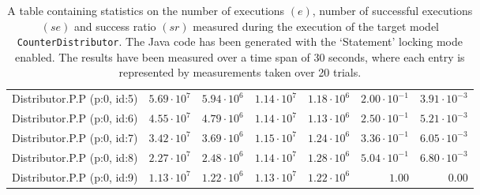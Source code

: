 \begin{table}[htbp]
{\begin{tabular}{lrrrrrr}
\hspace{3mm}Distributor.P.P (p:0, id:5) & $5.69 \cdot 10^{7}$ & $5.94 \cdot 10^{6}$ & $1.14 \cdot 10^{7}$ & $1.18 \cdot 10^{6}$ & $2.00 \cdot 10^{-1}$ & $3.91 \cdot 10^{-3}$ \\
\hspace{3mm}Distributor.P.P (p:0, id:6) & $4.55 \cdot 10^{7}$ & $4.79 \cdot 10^{6}$ & $1.14 \cdot 10^{7}$ & $1.13 \cdot 10^{6}$ & $2.50 \cdot 10^{-1}$ & $5.21 \cdot 10^{-3}$ \\
\hspace{3mm}Distributor.P.P (p:0, id:7) & $3.42 \cdot 10^{7}$ & $3.69 \cdot 10^{6}$ & $1.15 \cdot 10^{7}$ & $1.24 \cdot 10^{6}$ & $3.36 \cdot 10^{-1}$ & $6.05 \cdot 10^{-3}$ \\
\hspace{3mm}Distributor.P.P (p:0, id:8) & $2.27 \cdot 10^{7}$ & $2.48 \cdot 10^{6}$ & $1.14 \cdot 10^{7}$ & $1.28 \cdot 10^{6}$ & $5.04 \cdot 10^{-1}$ & $6.80 \cdot 10^{-3}$ \\
\hspace{3mm}Distributor.P.P (p:0, id:9) & $1.13 \cdot 10^{7}$ & $1.22 \cdot 10^{6}$ & $1.13 \cdot 10^{7}$ & $1.22 \cdot 10^{6}$ &               $1.00$ &               $0.00$ \\
\bottomrule
\end{tabular}
}
\caption{A table containing statistics on the number of executions $(e)$, number of successful executions $(se)$ and success ratio $(sr)$ measured during the execution of the target model \texttt{CounterDistributor}. The Java code has been generated with the `Statement' locking mode enabled. The results have been measured over a time span of 30 seconds, where each entry is represented by measurements taken over 20 trials.}
\label{table:frequency_results_counterdistributor_statement}
\end{table}